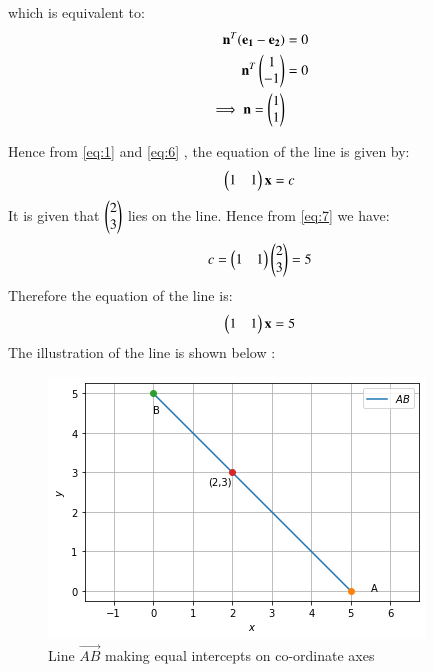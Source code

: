\documentclass[journal,12pt,twocolumn]{IEEEtran}
\begin{document}
which is equivalent to:
\begin{align}
\mathbf{n}^T(\mathbf{e_{1}}-\mathbf{e_{2}}) &= 0\\
\mathbf{n}^T\begin{pmatrix}1 \\ -1\end{pmatrix} &= 0\\
\implies \mathbf{n} = \begin{pmatrix}1 \\ 1\end{pmatrix}\label{eq:6}
\end{align}

Hence from \eqref{eq:1} and \eqref{eq:6} , the equation of the line is given by:
\begin{align}
\begin{pmatrix}1 & 1\end{pmatrix}\mathbf{x}=c\label{eq:7}
\end{align}
It is given that $\begin{pmatrix}2 \\ 3\end{pmatrix}$ lies on the line. Hence from \eqref{eq:7} we have:
\begin{align}
c =\begin{pmatrix}1 & 1\end{pmatrix}\begin{pmatrix}2 \\ 3\end{pmatrix} = 5
\end{align}
Therefore the equation of the line is:
\begin{align}
\begin{pmatrix}1 & 1\end{pmatrix}\mathbf{x}=5
\end{align}
The illustration of the line is shown below :
\begin{figure}[!ht]
       \centering
    \includegraphics[width=\columnwidth] {Assignment_4_Fig_1.png}
    \caption{Line $\vec{AB}$ making equal intercepts on co-ordinate axes}
    \label{Line AB}
\end{figure}
\end{document}
